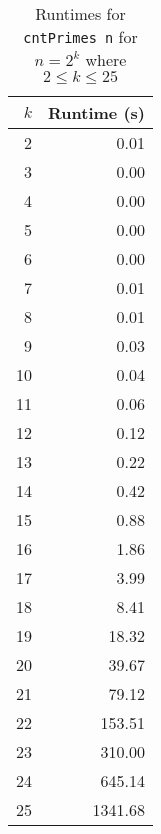 \documentclass[a4paper]{article}
\begin{document}
\begin{enumerate}
\begin{table}[h]
	\centering
	\caption{Runtimes for \texttt{cntPrimes n} for $n=2^k$ where $2 \leq k \leq 25$}
	\label{tbl:cntPrimes}
	\begin{tabular}{r|r}
		$k$ & Runtime (s) \\
		\hline
		 2 & 0.01 \\
		 3 & 0.00 \\
		 4 & 0.00 \\
		 5 & 0.00 \\
		 6 & 0.00 \\
		 7 & 0.01 \\
		 8 & 0.01 \\
		 9 & 0.03 \\
		10 & 0.04 \\
		11 & 0.06 \\
		12 & 0.12 \\
		13 & 0.22 \\
		14 & 0.42 \\
		15 & 0.88 \\
		16 & 1.86 \\
		17 & 3.99 \\
		18 & 8.41 \\
		19 & 18.32 \\
		20 & 39.67 \\
		21 & 79.12 \\
		22 & 153.51 \\
		23 & 310.00 \\
		24 & 645.14 \\
		25 & 1341.68 \\
	\end{tabular}

\end{table}
\end{enumerate}
\end{document}
